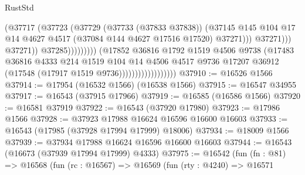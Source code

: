 \begin{lexlean}{RustStd}
\begin{coremodule}
                                                          (@37717
                                                            (@37723
                                                              (@37729
                                                                (@37733 (@37833 @37838))
                                                                (@37145
                                                                  @145
                                                                  @104
                                                                  @17
                                                                  @14
                                                                  @4627
                                                                  @4517
                                                                  (@37084 @144 @4627 @17516 @17520)
                                                                  @37271)))
                                                            @37271)))
                                                      @37271))
                                                  @37285)))))))))
                                (@17852
                                  @36816
                                  @1792
                                  @1519
                                  @4506
                                  @9738
                                  (@17483
                                    @36816
                                    @4333
                                    @214
                                    @1519
                                    @104
                                    @14
                                    @4506
                                    @4517
                                    @9736
                                    @17207
                                    @36912
                                    (@17548 (@17917 @1519 @9736))))))))))))))))))
@37910 := @16526 @1566
@37914 := @17954 (@16532 @1566) (@16538 @1566)
@37915 := @16547 @34955
@37917 := @16543 (@37915 @17966)
@37919 := @16585 (@16586 @1566)
@37920 := @16581 @37919
@37922 := @16543 (@37920 @17980)
@37923 := @17986 @1566
@37928 := @37923 @17988 @16624 @16596 @16600 @16603
@37933 := @16543 (@17985 (@37928 @17994 @17999) @18006)
@37934 := @18009 @1566
@37939 := @37934 @17988 @16624 @16596 @16600 @16603
@37944 := @16543 (@16673 (@37939 @17994 @17999) @4333)
@37975 := @16542
    (fun (fn : @81) =>
    @16568
      (fun (rc : @16567) =>
      @16569
        (fun (rty : @4240) =>
        @16571

\end{coremodule}
\end{lexlean}
